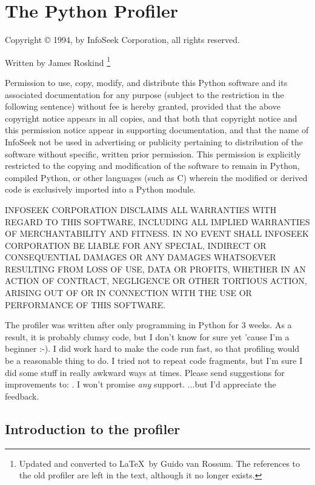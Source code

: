 \chapter{The Python Profiler}

Copyright \copyright{} 1994, by InfoSeek Corporation, all rights reserved.

Written by James Roskind%
\footnote{
Updated and converted to \LaTeX\ by Guido van Rossum.  The references to
the old profiler are left in the text, although it no longer exists.
}

Permission to use, copy, modify, and distribute this Python software
and its associated documentation for any purpose (subject to the
restriction in the following sentence) without fee is hereby granted,
provided that the above copyright notice appears in all copies, and
that both that copyright notice and this permission notice appear in
supporting documentation, and that the name of InfoSeek not be used in
advertising or publicity pertaining to distribution of the software
without specific, written prior permission.  This permission is
explicitly restricted to the copying and modification of the software
to remain in Python, compiled Python, or other languages (such as C)
wherein the modified or derived code is exclusively imported into a
Python module.

INFOSEEK CORPORATION DISCLAIMS ALL WARRANTIES WITH REGARD TO THIS
SOFTWARE, INCLUDING ALL IMPLIED WARRANTIES OF MERCHANTABILITY AND
FITNESS. IN NO EVENT SHALL INFOSEEK CORPORATION BE LIABLE FOR ANY
SPECIAL, INDIRECT OR CONSEQUENTIAL DAMAGES OR ANY DAMAGES WHATSOEVER
RESULTING FROM LOSS OF USE, DATA OR PROFITS, WHETHER IN AN ACTION OF
CONTRACT, NEGLIGENCE OR OTHER TORTIOUS ACTION, ARISING OUT OF OR IN
CONNECTION WITH THE USE OR PERFORMANCE OF THIS SOFTWARE.


The profiler was written after only programming in Python for 3 weeks.
As a result, it is probably clumsy code, but I don't know for sure yet
'cause I'm a beginner :-).  I did work hard to make the code run fast,
so that profiling would be a reasonable thing to do.  I tried not to
repeat code fragments, but I'm sure I did some stuff in really awkward
ways at times.  Please send suggestions for improvements to:
.  I won't promise \emph{any} support.  ...but
I'd appreciate the feedback.


\section{Introduction to the profiler}

